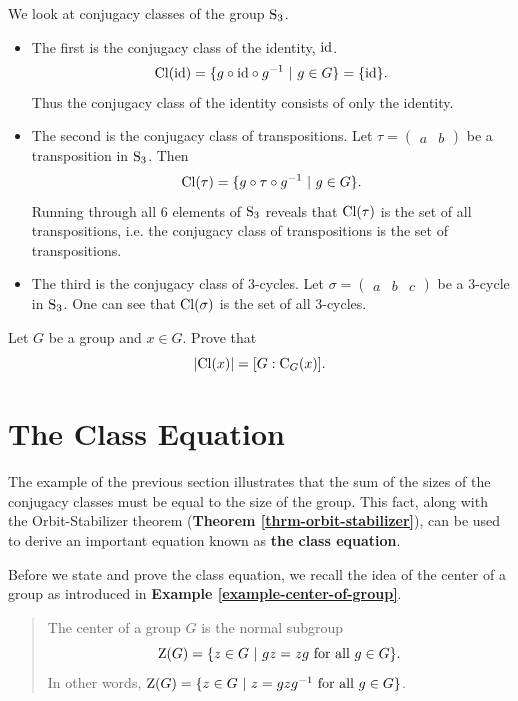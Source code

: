 \begin{example}\label{example-conjugacy-classes-of-Sn3}
    We look at conjugacy classes of the group $\mathrm{S}_{3}$.
    \begin{itemize}
        \item The first is the conjugacy class of the identity, $\mathrm{id}$.
        \[
            \mathrm{Cl}(\mathrm{id}) = \{g\circ\mathrm{id}\circ g^{-1} \ | \ g \in G \} = \{\mathrm{id}\}.
        \]
        Thus the conjugacy class of the identity consists of only the identity.
        \item The second is the conjugacy class of transpositions. Let $\tau = \begin{pmatrix}a & b\end{pmatrix}$ be a transposition in $\mathrm{S}_{3}$. Then
        \[
            \Cl{\tau} = \{g\circ\tau\circ g^{-1} \ | \ g \in G\}.
        \]
        Running through all 6 elements of $\mathrm{S}_{3}$ reveals that $\mathrm{Cl}(\tau)$ is the set of all transpositions, i.e. the conjugacy class of transpositions is the set of transpositions.
        \item The third is the conjugacy class of 3-cycles. Let $\sigma = \begin{pmatrix}a & b & c\end{pmatrix}$ be a 3-cycle in $\mathrm{S}_{3}$. One can see that $\mathrm{Cl}(\sigma)$ is the set of all 3-cycles.
    \end{itemize}
\end{example}

\begin{exercise}\label{exercise-order-of-conjugacy-class}
    Let $G$ be a group and $x \in G$. Prove that
    \[
        |\mathrm{Cl}(x)| = [G : \mathrm{C}_{G}(x)].
    \]
\end{exercise}


\section{The Class Equation}
The example of the previous section illustrates that the sum of the sizes of the conjugacy classes must be equal to the size of the group. This fact, along with the Orbit-Stabilizer theorem (\textbf{Theorem \ref{thrm-orbit-stabilizer}}), can be used to derive an important equation known as \textbf{the class equation}.

Before we state and prove the class equation, we recall the idea of the center of a group as introduced in \textbf{Example \ref{example-center-of-group}}.
\begin{quote}
    The center of a group $G$ is the normal subgroup
    \[
        \Z{G} = \{z \in G \ | \ gz = zg \text{ for all } g \in G\}.
    \]
    In other words, $\mathrm{Z}(G) = \{z \in G \ | \ z = gzg^{-1} \text{ for all } g \in G\}$.
\end{quote}

